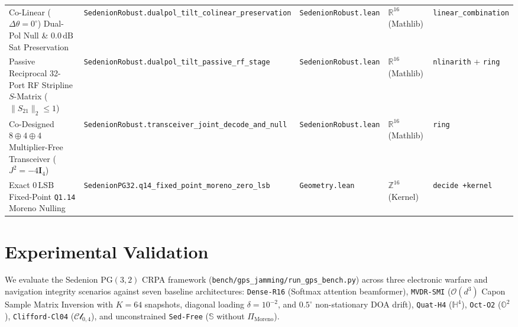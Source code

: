 \documentclass[11pt,a4paper]{article}
\theoremstyle{definition}
\theoremstyle{remark}
\newcommand{\R}{\mathbb{R}}
\newcommand{\Ha}{\mathbb{H}}
\newcommand{\Oc}{\mathbb{O}}
\newcommand{\Se}{\mathbb{S}}
\newcommand{\PG}{\mathrm{PG}}
\newcommand{\PiMoreno}{\Pi_{\mathrm{Moreno}}}
\begin{document}
\begin{table}[t!]
{\begin{tabular}{@{}lllll@{}}
Co-Linear ($\Delta\theta=0^\circ$) Dual-Pol Null \& $0.0\,\mathrm{dB}$ Sat Preservation & \texttt{SedenionRobust.dualpol\_tilt\_colinear\_preservation} & \texttt{SedenionRobust.lean} & $\R^{16}$ (Mathlib) & \texttt{linear\_combination} \\
Passive Reciprocal 32-Port RF Stripline $S$-Matrix ($\|S_{21}\|_2 \le 1$) & \texttt{SedenionRobust.dualpol\_tilt\_passive\_rf\_stage} & \texttt{SedenionRobust.lean} & $\R^{16}$ (Mathlib) & \texttt{nlinarith} + \texttt{ring} \\
Co-Designed $8\oplus 4\oplus 4$ Multiplier-Free Transceiver ($J^2=-4\bm{I}_4$) & \texttt{SedenionRobust.transceiver\_joint\_decode\_and\_null} & \texttt{SedenionRobust.lean} & $\R^{16}$ (Mathlib) & \texttt{ring} \\
Exact $0\,\mathrm{LSB}$ Fixed-Point \texttt{Q1.14} Moreno Nulling & \texttt{SedenionPG32.q14\_fixed\_point\_moreno\_zero\_lsb} & \texttt{Geometry.lean} & $\mathbb{Z}^{16}$ (Kernel) & \texttt{decide +kernel} \\
\bottomrule
\end{tabular}}
\end{table}

\section{Experimental Validation}
\label{sec:experiments}

We evaluate the Sedenion $\PG(3,2)$ CRPA framework (\texttt{bench/gps\_jamming/run\_gps\_bench.py}) across three electronic warfare and navigation integrity scenarios against seven baseline architectures: \texttt{Dense-R16} (Softmax attention beamformer), \texttt{MVDR-SMI} ($\mathcal{O}(d^3)$ Capon Sample Matrix Inversion with $K=64$ snapshots, diagonal loading $\delta = 10^{-2}$, and $0.5^\circ$ non-stationary DOA drift), \texttt{Quat-H4} ($\Ha^4$), \texttt{Oct-O2} ($\Oc^2$), \texttt{Clifford-Cl04} ($\mathcal{Cl}_{0,4}$), and unconstrained \texttt{Sed-Free} ($\Se$ without $\PiMoreno$).
\end{document}
